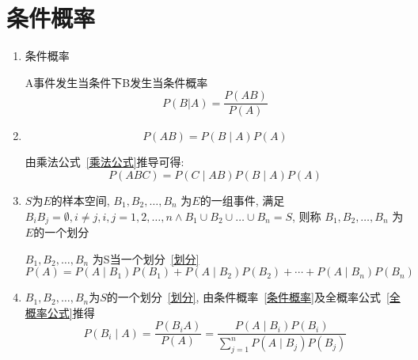 \documentclass[main.tex]{subfiles}
\begin{document}
\section{条件概率}
\begin{enumerate}
    \item 条件概率
        \begin{mthm}[条件概率]\label{条件概率}
            A事件发生当条件下B发生当条件概率
            \[P(B | A) = \dfrac{P(AB)}{P(A)}\]
        \end{mthm}
    \item {}
        \begin{mthm}[乘法定理]\label{乘法定理}\label{乘法公式}
            \[P(AB) = P(B \mid A)P(A)\]
        \end{mthm}
        由乘法公式~\ref{乘法公式}推导可得:
        \[P(ABC) = P(C \mid AB)P(B \mid A)P(A)\]
    \item {}
        \begin{define}[划分]\label{划分}
            $S$为$E$的样本空间, $B_1, B_2, \ldots, B_n$ 为$E$的一组事件,
            满足 $B_i B_j = \emptyset, i \not= j, i, j = 1, 2, \ldots, n \land B_1 \cup B_2 \cup \ldots \cup B_n = S$,
            则称 $B_1, B_2, \ldots, B_n$ 为$E$的一个划分
        \end{define}
        \begin{mthm}[全概率公式]\label{全概率公式}
            $B_1, B_2, \ldots, B_n$ 为S当一个划分~\ref{划分}
            \[P(A) = P(A \mid B_1)P(B_1) + P(A \mid B_2)P(B_2) + \cdots + P(A \mid B_n)P(B_n)\]
        \end{mthm}
    \item {}
        \begin{mthm}[贝叶斯公式]\label{贝叶斯公式}
            $B_1, B_2, \ldots, B_n$为$S$的一个划分~\ref{划分},
            由条件概率~\ref{条件概率}及全概率公式~\ref{全概率公式}推得
            \[
                P(B_i \mid A) = \frac{P(B_i A)}{P(A)} = \frac{P(A \mid B_i)P(B_i)}{\sum_{j=1}^{n}P(A \mid B_j)P(B_j)}
            \]
        \end{mthm}
\end{enumerate}
\end{document}

